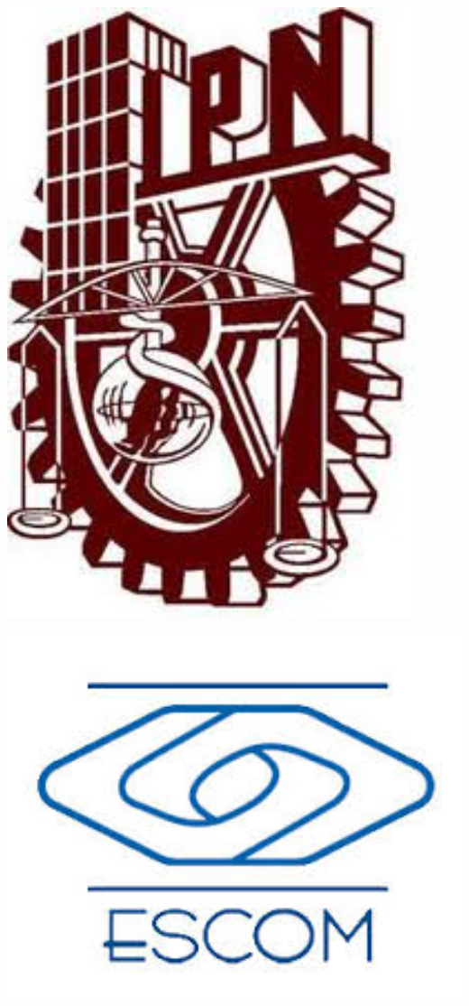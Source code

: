 \thispagestyle{empty}

\begin{minipage}{0.13\textwidth}
	\includegraphics[width=0.9\textwidth]{portada/ipn.jpg}
\end{minipage}%
\begin{minipage}{0.65\textwidth}
\hspace{15cm}
\end{minipage}
\begin{minipage}{0.20\textwidth}
\includegraphics[width=1\textwidth]{portada/escom.jpg}

\end{minipage}%

